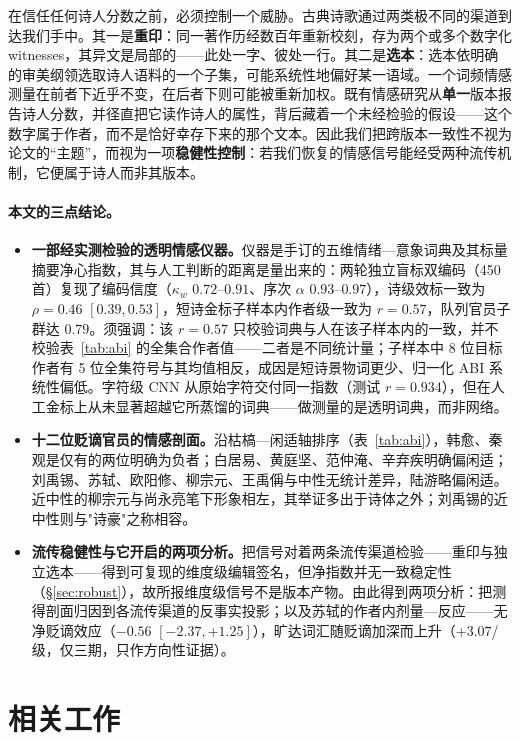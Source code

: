 \documentclass[11pt]{article}
\begin{document}
在信任任何诗人分数之前，必须控制一个威胁。古典诗歌通过两类极不同的渠道到达我们手中。其一是\textbf{重印}：同一著作历经数百年重新校刻，存为两个或多个数字化 witnesses，其异文是局部的——此处一字、彼处一行。其二是\textbf{选本}：选本依明确的审美纲领选取诗人语料的一个子集，可能系统性地偏好某一语域。一个词频情感测量在前者下近乎不变，在后者下则可能被重新加权。既有情感研究从\textbf{单一}版本报告诗人分数，并径直把它读作诗人的属性，背后藏着一个未经检验的假设——这个数字属于作者，而不是恰好幸存下来的那个文本。因此我们把跨版本一致性不视为论文的“主题”，而视为一项\textbf{稳健性控制}：若我们恢复的情感信号能经受两种流传机制，它便属于诗人而非其版本。

\paragraph{本文的三点结论。}
\begin{itemize}
\item \textbf{一部经实测检验的透明情感仪器。}仪器是手订的五维情绪—意象词典及其标量摘要净心指数，其与人工判断的距离是量出来的：两轮独立盲标双编码（450 首）复现了编码信度（$\kappa_w$ $0.72$–$0.91$、序次 $\alpha$ $0.93$–$0.97$），诗级效标一致为 $\rho{=}0.46$ $[0.39,0.53]$，短诗金标子样本内作者级一致为 $r{=}0.57$，队列官员子群达 $0.79$。须强调：该 $r{=}0.57$ 只校验词典与人在该子样本内的一致，并不校验表~\ref{tab:abi} 的全集合作者值——二者是不同统计量；子样本中 8 位目标作者有 5 位全集符号与其均值相反，成因是短诗景物词更少、归一化 ABI 系统性偏低。字符级 CNN 从原始字符交付同一指数（测试 $r{=}0.934$），但在人工金标上从未显著超越它所蒸馏的词典——做测量的是透明词典，而非网络。
\item \textbf{十二位贬谪官员的情感剖面。}沿枯槁—闲适轴排序（表~\ref{tab:abi}），韩愈、秦观是仅有的两位明确为负者；白居易、黄庭坚、范仲淹、辛弃疾明确偏闲适；刘禹锡、苏轼、欧阳修、柳宗元、王禹偁与中性无统计差异，陆游略偏闲适。近中性的柳宗元与尚永亮笔下形象相左，其举证多出于诗体之外；刘禹锡的近中性则与"诗豪"之称相容。
\item \textbf{流传稳健性与它开启的两项分析。}把信号对着两条流传渠道检验——重印与独立选本——得到可复现的维度级编辑签名，但净指数并无一致稳定性（\S\ref{sec:robust}），故所报维度级信号不是版本产物。由此得到两项分析：把测得剖面归因到各流传渠道的反事实投影；以及苏轼的作者内剂量—反应——无净贬谪效应（$-0.56$ $[-2.37,+1.25]$），旷达词汇随贬谪加深而上升（$+3.07$/级，仅三期，只作方向性证据）。
\end{itemize}

\section{相关工作}
\label{sec:related}
\end{document}
